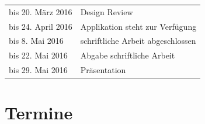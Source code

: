 \begin{longtable}[c]{@{}ll@{}}
\begin{minipage}[t]{0.37\columnwidth}
bis 20. März 2016
\strut\end{minipage} &
\begin{minipage}[t]{0.26\columnwidth}\raggedright\strut
Design Review
\strut\end{minipage}\tabularnewline
\begin{minipage}[t]{0.37\columnwidth}\raggedright\strut
bis 24. April 2016
\strut\end{minipage} &
\begin{minipage}[t]{0.26\columnwidth}\raggedright\strut
Applikation steht zur Verfügung
\strut\end{minipage}\tabularnewline
\begin{minipage}[t]{0.37\columnwidth}\raggedright\strut
bis 8. Mai 2016
\strut\end{minipage} &
\begin{minipage}[t]{0.26\columnwidth}\raggedright\strut
schriftliche Arbeit abgeschlossen
\strut\end{minipage}\tabularnewline
\begin{minipage}[t]{0.37\columnwidth}\raggedright\strut
bis 22. Mai 2016
\strut\end{minipage} &
\begin{minipage}[t]{0.26\columnwidth}\raggedright\strut
Abgabe schriftliche Arbeit
\strut\end{minipage}\tabularnewline
\begin{minipage}[t]{0.37\columnwidth}\raggedright\strut
bis 29. Mai 2016
\strut\end{minipage} &
\begin{minipage}[t]{0.26\columnwidth}\raggedright\strut
Präsentation
\strut\end{minipage}\tabularnewline
\bottomrule
\end{longtable}

\newpage

\section{Termine}\label{termine}

